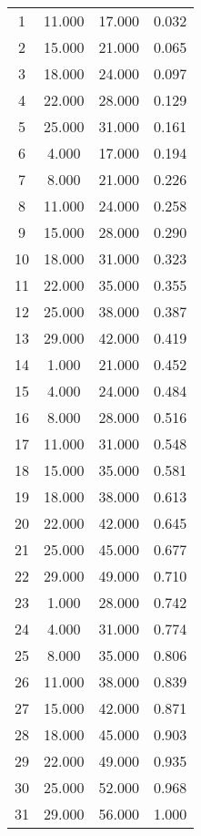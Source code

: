 % 
\begin{tabular}{cccc}
  \hline
  \hline
1 & 11.000 & 17.000 & 0.032 \\ 
  2 & 15.000 & 21.000 & 0.065 \\ 
  3 & 18.000 & 24.000 & 0.097 \\ 
  4 & 22.000 & 28.000 & 0.129 \\ 
  5 & 25.000 & 31.000 & 0.161 \\ 
  6 & 4.000 & 17.000 & 0.194 \\ 
  7 & 8.000 & 21.000 & 0.226 \\ 
  8 & 11.000 & 24.000 & 0.258 \\ 
  9 & 15.000 & 28.000 & 0.290 \\ 
  10 & 18.000 & 31.000 & 0.323 \\ 
  11 & 22.000 & 35.000 & 0.355 \\ 
  12 & 25.000 & 38.000 & 0.387 \\ 
  13 & 29.000 & 42.000 & 0.419 \\ 
  14 & 1.000 & 21.000 & 0.452 \\ 
  15 & 4.000 & 24.000 & 0.484 \\ 
  16 & 8.000 & 28.000 & 0.516 \\ 
  17 & 11.000 & 31.000 & 0.548 \\ 
  18 & 15.000 & 35.000 & 0.581 \\ 
  19 & 18.000 & 38.000 & 0.613 \\ 
  20 & 22.000 & 42.000 & 0.645 \\ 
  21 & 25.000 & 45.000 & 0.677 \\ 
  22 & 29.000 & 49.000 & 0.710 \\ 
  23 & 1.000 & 28.000 & 0.742 \\ 
  24 & 4.000 & 31.000 & 0.774 \\ 
  25 & 8.000 & 35.000 & 0.806 \\ 
  26 & 11.000 & 38.000 & 0.839 \\ 
  27 & 15.000 & 42.000 & 0.871 \\ 
  28 & 18.000 & 45.000 & 0.903 \\ 
  29 & 22.000 & 49.000 & 0.935 \\ 
  30 & 25.000 & 52.000 & 0.968 \\ 
  31 & 29.000 & 56.000 & 1.000 \\ 
   \hline
\end{tabular}
